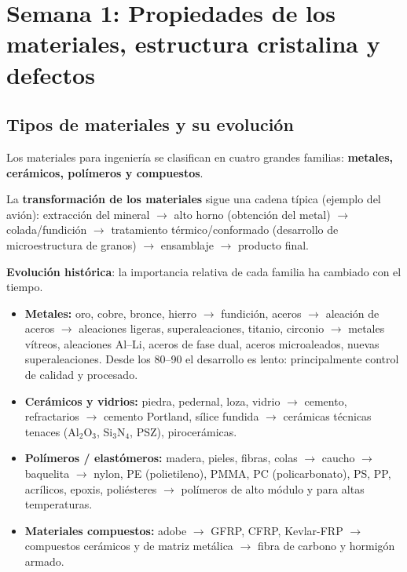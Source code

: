 \documentclass[12pt,a4paper]{article}
\begin{document}
\thispagestyle{fancy}

\section{Semana 1: Propiedades de los materiales, estructura cristalina y
  defectos}

\subsection{Tipos de materiales y su evolución}

Los materiales para ingeniería se clasifican en cuatro grandes familias:
\textbf{metales, cerámicos, polímeros y compuestos}.

La \textbf{transformación de los materiales} sigue una cadena típica (ejemplo
del avión): extracción del mineral $\rightarrow$ alto horno (obtención del
metal) $\rightarrow$ colada/fundición $\rightarrow$ tratamiento
térmico/conformado (desarrollo de microestructura de granos) $\rightarrow$
ensamblaje $\rightarrow$ producto final.

\textbf{Evolución histórica}: la importancia relativa de cada familia ha
cambiado con el tiempo.
\begin{itemize}
	\item \textbf{Metales:} oro, cobre, bronce, hierro $\rightarrow$ fundición,
	      aceros $\rightarrow$ aleación de aceros $\rightarrow$ aleaciones
	      ligeras,
	      superaleaciones, titanio, circonio $\rightarrow$ metales vítreos,
	      aleaciones
	      Al--Li, aceros de fase dual, aceros microaleados, nuevas
	      superaleaciones. Desde
	      los 80--90 el desarrollo es lento: principalmente control de calidad y
	      procesado.
	\item \textbf{Cerámicos y vidrios:} piedra, pedernal, loza, vidrio
	      $\rightarrow$ cemento, refractarios $\rightarrow$ cemento Portland,
	      sílice
	      fundida $\rightarrow$ cerámicas técnicas tenaces (Al$_2$O$_3$,
	      Si$_3$N$_4$,
	      PSZ), pirocerámicas.
	\item \textbf{Polímeros / elastómeros:} madera, pieles, fibras, colas
	      $\rightarrow$ caucho $\rightarrow$ baquelita $\rightarrow$ nylon, PE
	      (polietileno), PMMA, PC (policarbonato), PS, PP, acrílicos, epoxis,
	      poliésteres $\rightarrow$ polímeros de alto módulo y para altas
	      temperaturas.
	\item \textbf{Materiales compuestos:} adobe $\rightarrow$ GFRP, CFRP,
	      Kevlar-FRP $\rightarrow$ compuestos cerámicos y de matriz metálica
	      $\rightarrow$ fibra de carbono y hormigón armado.
\end{itemize}
\end{document}
